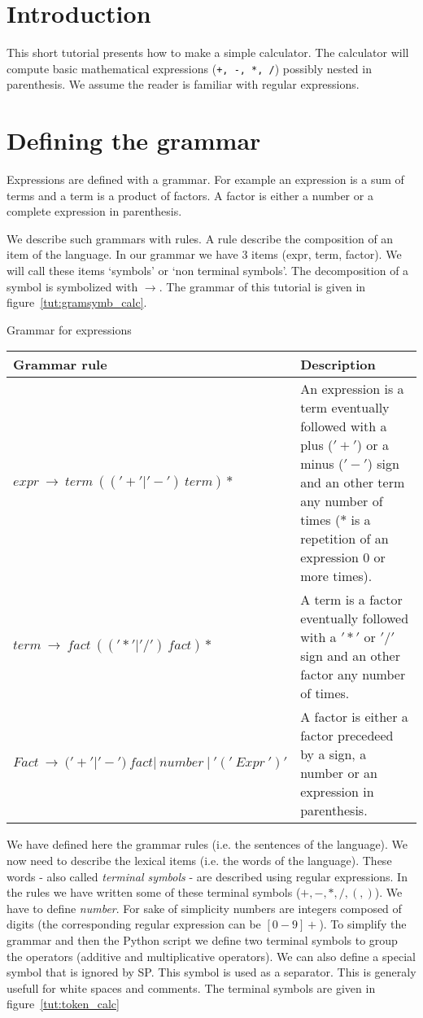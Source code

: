 \section{Introduction}

This short tutorial presents how to make a simple calculator.
The calculator will compute basic mathematical expressions (\verb|+, -, *, /|) possibly nested in parenthesis.
We assume the reader is familiar with regular expressions.

\section{Defining the grammar}

Expressions are defined with a grammar.
For example an expression is a sum of terms and a term is a product of factors. A factor is either a number or a complete expression in parenthesis.

We describe such grammars with rules. A rule describe the composition of an item of the language. In our grammar we have 3 items (expr, term, factor). We will call these items `symbols' or `non terminal symbols'. The decomposition of a symbol is symbolized with $\to$.
The grammar of this tutorial is given in figure~\ref{tut:gramsymb_calc}.

\begin{tableau}
\caption{Grammar for expressions}                           \label{tut:gramsymb_calc}
\begin{tabular}{| l | p{7cm} |}
\hline
    Grammar rule & Description \\
\hline
\hline
    $expr~\to~term~(('+'|'-')~term)*$
        & An expression is a term eventually followed with a plus ($'+'$) or a minus ($'-'$) sign and an other term any number of times ($*$ is a repetition of an expression 0 or more times). \\
\hline
    $term~\to~fact~(('*'|'/')~fact)*$
        & A term is a factor eventually followed with a $'*'$ or $'/'$ sign and an other factor any number of times. \\
\hline
    $Fact~\to~('+'|'-')~fact|~number~|~'('~Expr~')'$
        & A factor is either a factor precedeed by a sign, a number or an expression in parenthesis. \\
\hline
\end{tabular}
\end{tableau}

We have defined here the grammar rules (i.e. the sentences of the language). We now need to describe the lexical items (i.e. the words of the language). These words - also called \emph{terminal symbols} - are described using regular expressions. In the rules we have written some of these terminal symbols ($+, -, *, /, (, )$). We have to define \emph{number}. For sake of simplicity numbers are integers composed of digits (the corresponding regular expression can be $[0-9]+$).
To simplify the grammar and then the Python script we define two terminal symbols to group the operators (additive and multiplicative operators). We can also define a special symbol that is ignored by SP. This symbol is used as a separator. This is generaly usefull for white spaces and comments. The terminal symbols are given in figure~\ref{tut:token_calc}

